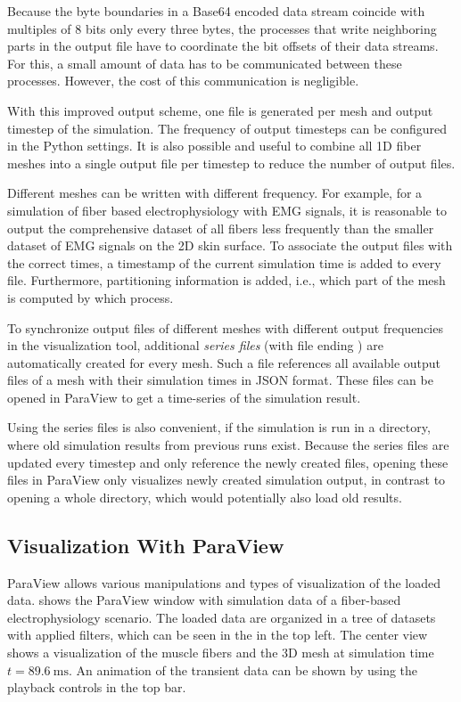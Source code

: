 Because the byte boundaries in a Base64 encoded data stream coincide with multiples of 8 bits only every three bytes, the processes that write neighboring parts in the output file have to coordinate the bit offsets of their data streams. For this, a small amount of data has to be communicated between these processes. However, the cost of this communication is negligible.

With this improved output scheme, one file is generated per mesh and output timestep of the simulation. The frequency of output timesteps can be configured in the Python settings.
It is also possible and useful to combine all 1D fiber meshes into a single output file per timestep to reduce the number of output files.

Different meshes can be written with different frequency. For example, for a simulation of fiber based electrophysiology with EMG signals, it is reasonable to output the comprehensive dataset of all fibers less frequently than the smaller dataset of EMG signals on the 2D skin surface. To associate the output files with the correct times, a timestamp of the current simulation time is added to every file. Furthermore, partitioning information is added, i.e., which part of the mesh is computed by which process.

To synchronize output files of different meshes with different output frequencies in the visualization tool, additional \emph{series files} (with file ending ) are automatically created for every mesh. Such a file references all available output files of a mesh with their simulation times in JSON format. These files can be opened in ParaView to get a time-series of the simulation result.

Using the series files is also convenient, if the simulation is run in a directory, where old simulation results from previous runs exist. Because the series files are updated every timestep and only reference the newly created files, opening these files in ParaView only visualizes newly created simulation output, in contrast to opening a whole directory, which would potentially also load old results.

\subsection{Visualization With ParaView}
ParaView allows various manipulations and types of visualization of the loaded data.  shows the ParaView window with simulation data of a fiber-based electrophysiology scenario. The loaded data are organized in a tree of datasets with applied filters, which can be seen in the  in the top left. The center view shows a visualization of the muscle fibers and the 3D mesh at simulation time $t=\SI{89.6}{\milli\second}$. An animation of the transient data can be shown by using the playback controls in the top bar.

